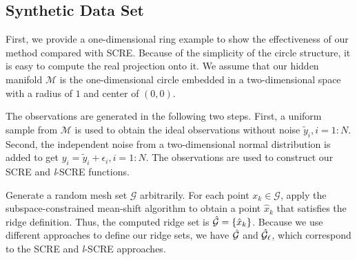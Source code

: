\documentclass[aos,preprint]{imsart}
\theoremstyle{remark}
\begin{document}
\subsection{Synthetic Data Set}
First, we provide a one-dimensional ring example to show the effectiveness of our method compared with SCRE. Because of the simplicity of the circle structure, it is easy to compute the real projection onto it. We assume that our hidden manifold ${\mathcal M}$ is the one-dimensional circle embedded in a two-dimensional space with a radius of $1$ and center of $(0,0)$.

The observations are generated in the following two steps. First, a uniform sample from ${\mathcal M}$ is used to obtain the ideal observations without noise $\tilde{y}_i, i = 1:N$. Second, the independent noise from a two-dimensional normal distribution is added to get $y_i = \tilde{y}_i+\epsilon_i, i=1:N$. The observations are used to construct our SCRE and {\it l}-SCRE functions.

Generate a random mesh set $\mathcal G$ arbitrarily. For each point $x_k \in \mathcal G$, apply the subspace-constrained mean-shift algorithm to obtain a point $\hat{x}_k$ that satisfies the ridge definition. Thus, the computed ridge set is ${\cal \hat{G}}=\{\hat{x}_k\}$. Because we use different approaches to define our ridge sets, we have ${\cal \hat{G}}$ and ${\cal \hat{G}}_\ell$, which correspond to the SCRE and {\it l}-SCRE approaches.
\end{document}

